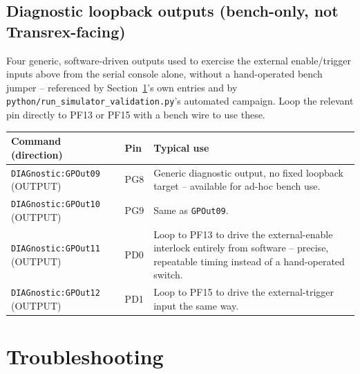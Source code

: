 \documentclass[11pt]{article}
\newcommand{\code}[1]{\texttt{#1}}
\begin{document}
\subsection{Diagnostic loopback outputs (bench-only, not Transrex-facing)}

Four generic, software-driven outputs used to exercise the external
enable/trigger inputs above from the serial console alone, without a
hand-operated bench jumper -- referenced by
Section~\ref{sec:troubleshooting}'s own entries and by
\code{python/run\_simulator\_validation.py}'s automated campaign. Loop
the relevant pin directly to PF13 or PF15 with a bench wire to use
these.

\begin{longtable}{p{1.7in} p{0.4in} p{2.5in}}
  \hline
  \textbf{Command (direction)} & \textbf{Pin} & \textbf{Typical use} \\
  \hline
  \endhead
  \code{DIAGnostic:GPOut09} (OUTPUT) & PG8 & Generic diagnostic
    output, no fixed loopback target -- available for ad-hoc bench
    use. \\
  \code{DIAGnostic:GPOut10} (OUTPUT) & PG9 & Same as \code{GPOut09}. \\
  \code{DIAGnostic:GPOut11} (OUTPUT) & PD0 & Loop to PF13 to drive the
    external-enable interlock entirely from software -- precise,
    repeatable timing instead of a hand-operated switch. \\
  \code{DIAGnostic:GPOut12} (OUTPUT) & PD1 & Loop to PF15 to drive the
    external-trigger input the same way. \\
  \hline
\end{longtable}

\section{Troubleshooting}
\label{sec:troubleshooting}
\end{document}
